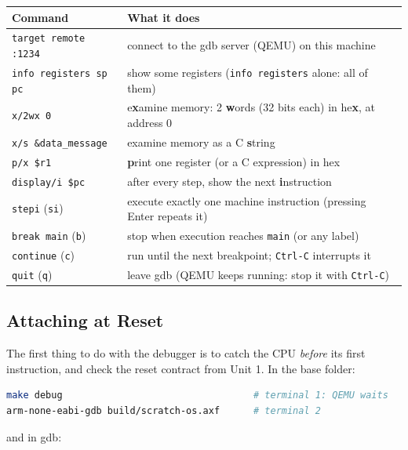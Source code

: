 \begin{table}[h!]
    \centering
    \begin{tabular}{|l|l|}
        \hline
        \textbf{Command} & \textbf{What it does} \\ \hline
        \texttt{target remote :1234} & connect to the gdb server (QEMU) on this machine \\ \hline
        \texttt{info registers sp pc} & show some registers (\texttt{info registers} alone: all of them) \\ \hline
        \texttt{x/2wx 0} & e\textbf{x}amine memory: 2 \textbf{w}ords (32 bits each) in he\textbf{x}, at address 0 \\ \hline
        \texttt{x/s \&data\_message} & examine memory as a C \textbf{s}tring \\ \hline
        \texttt{p/x \$r1} & \textbf{p}rint one register (or a C expression) in hex \\ \hline
        \texttt{display/i \$pc} & after every step, show the next \textbf{i}nstruction \\ \hline
        \texttt{stepi} (\texttt{si}) & execute exactly one machine instruction (pressing Enter repeats it) \\ \hline
        \texttt{break main} (\texttt{b}) & stop when execution reaches \texttt{main} (or any label) \\ \hline
        \texttt{continue} (\texttt{c}) & run until the next breakpoint; \texttt{Ctrl-C} interrupts it \\ \hline
        \texttt{quit} (\texttt{q}) & leave gdb (QEMU keeps running: stop it with \texttt{Ctrl-C}) \\ \hline
    \end{tabular}
\end{table}

\subsection{Attaching at Reset}
The first thing to do with the debugger is to catch the CPU \textit{before} its first instruction, and check the reset contract from Unit 1. In the base folder:

\begin{lstlisting}[language=bash]
make debug                                  # terminal 1: QEMU waits
arm-none-eabi-gdb build/scratch-os.axf      # terminal 2
\end{lstlisting}

and in gdb:

